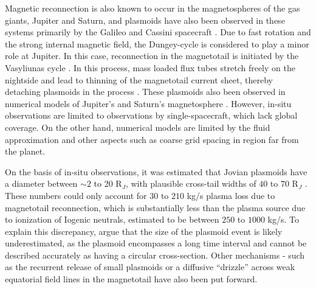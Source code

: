 Magnetic reconnection is also known to occur in the magnetospheres of the gas giants, Jupiter and Saturn, and plasmoids have also been observed in these systems primarily by the Galileo and Cassini spacecraft \cite{Russell2000SubstormsTail, Woch2002a, Kronberg2007AMagnetosphere, Kronberg2008MassParameters, Vogt2010a, Vogt2014, Jackman2011CassiniSaturn}. Due to fast rotation and the strong internal magnetic field, the Dungey-cycle is considered to play a minor role at Jupiter. In this case, reconnection in the magnetotail is initiated by the Vasyliunas cycle \cite{Vasyliunas1983a}. In this process, mass loaded flux tubes stretch freely on the nightside and lead to thinning of the magnetotail current sheet, thereby detaching plasmoids in the process \cite{Kivelson2005DynamicalMagnetosphere,Cowley2015Down-tailMagnetospheres}. These plasmoids also been observed in numerical models of Jupiter's \cite{Fukazawa2010a,Chane2017a,Sarkango2019} and Saturn's magnetosphere \cite{Jia2012}. However, in-situ observations are limited to observations by single-spacecraft, which lack global coverage. On the other hand, numerical models are limited by the fluid approximation and other aspects such as coarse grid spacing in region far from the planet.

On the basis of in-situ observations, it was estimated that Jovian plasmoids have a diameter between $\sim2$ to 20 R$_J$, with plausible cross-tail widths of $40$ to $70$ R$_J$ \cite{Vogt2014}. These numbers could only account for $30$ to $210$ kg/s plasma loss due to magnetotail reconnection, which is substantially less than the plasma source due to ionization of Iogenic neutrals, estimated to be between $250$ to $1000$ kg/s. To explain this discrepancy,  argue that the size of the plasmoid event is likely underestimated, as the plasmoid encompasses a long time interval and cannot be described accurately as having a circular cross-section. Other mechanisms - such as the recurrent release of small plasmoids \cite{Kivelson2005DynamicalMagnetosphere} or a diffusive ``drizzle'' across weak equatorial field lines in the magnetotail \cite{Bagenal2007ThePoles} have also been put forward. 

